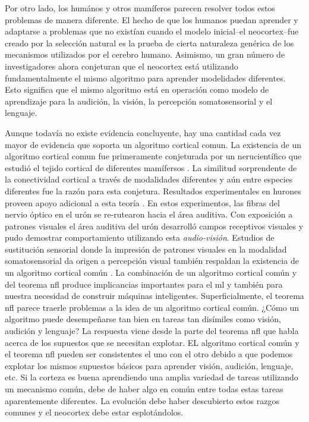 Por otro lado, los humános y otros mamíferos parecen resolver todos estos problemas de manera diferente.
El hecho de que los humanos puedan aprender y adaptarse a problemas que no existían
cuando el modelo inicial--el neocortex--fue creado por la selección natural
es la prueba de cierta naturaleza genérica de los mecanismos utilizados por el cerebro humano.
Asimismo, un gran número de investigadores ahora conjeturan que el neocortex está utilizando fundamentalmente el mismo algoritmo
para aprender modelidades diferentes.
Esto significa que el mismo algoritmo está en operación como modelo de aprendizaje para la audición, la visión, la percepción somatosensorial
y el lenguaje.

Aunque todavía no existe evidencia concluyente, hay una cantidad cada vez mayor de evidencia que soporta un algoritmo cortical comun.
La existencia de un algoritmo cortical comun fue primeramente conjeturada por un nerucientífico que estudió el tejido cortical de diferentes mamífersos \cite{mountcastle_1978}.
La similitud sorprendente de la conectividad cortical a través de modalidades diferentes
y aún entre especies diferentes fue la razón para esta conjetura.
Resultados experimentales en hurones proveen apoyo adicional a esta teoría \cite{von2000visual}.
En estos experimentos, las fibras del nervio óptico en el urón se re-rutearon hacia el área auditiva.
Con exposición a patrones visuales el área auditiva del urón desarrolló campos receptivos visuales
y pudo demostrar comportamiento utilizando esta \emph{audio-visión}.
Estudios de sustitución sensorial donde la impresión de patrones visuales en la modalidad somatosensorial
da origen a percepción visual también respaldan la existencia de un algoritmo cortical común \cite{doi:10.1196/annals.1305.006,BachyRita2003SensorySA}.
La combinación de un algoritmo cortical común y del teorema \gls{nfl} produce implicancias importantes para el \gls{ml}
y también para nuestra necesidad de construir máquinas inteligentes.
Superficialmente, el teorema \gls{nfl} parece traerle problemas a la idea de un algoritmo cortical común.
¿Cómo un algoritmo puede desempeñarse tan bien en tareas tan disímiles como
visión, audición y lenguaje?
La respuesta viene desde la parte del teorema \gls{nfl} que habla acerca de los supuestos que se necesitan explotar.
EL algoritmo cortical común y el teorema \gls{nfl} pueden ser consistentes el uno con el otro
debido a que podemos explotar los mismos supuestos básicos para aprender visión, audición,
lenguaje, etc.
Si la corteza es buena aprendiendo una amplia variedad de tareas utilizando un mecanismo común,
debe de haber algo en común entre todas estas tareas aparentemente diferentes.
La evolución debe haber descubierto estos razgos comunes y el neocortex debe estar esplotándolos. 

